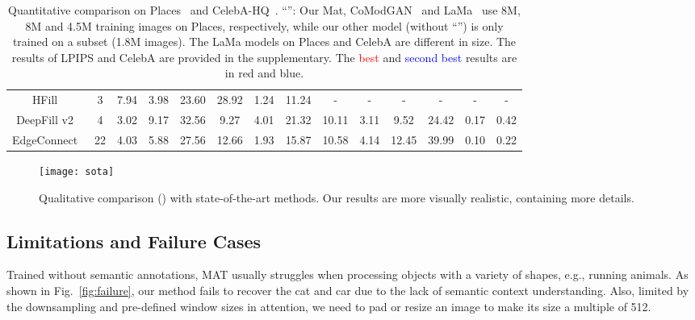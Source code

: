 \documentclass[10pt,twocolumn,letterpaper]{article}
\begin{document}
\begin{table*}[t]
\begin{center}
{\begin{tabular}{c | c | c c c | c c c | c c c | c c c }
					HFill~\cite{yi2020contextual} & 3 & 7.94 & 3.98 & 23.60 & 28.92 & 1.24 & 11.24 & - & - & - & - & - & - \\
					DeepFill v2~\cite{yu2019free} & 4 & 3.02 & 9.17 & 32.56 & 9.27 & 4.01 & 21.32 & 10.11 & 3.11 & 9.52 & 24.42 & 0.17 & 0.42\\
					EdgeConnect~\cite{nazeri2019edgeconnect} & 22 & 4.03 & 5.88 & 27.56 & 12.66 & 1.93 & 15.87 & 10.58 & 4.14 & 12.45 & 39.99 & 0.10 & 0.22 \\
\hline  
				\end{tabular}
			}
		\end{center}
		\vspace{-0.15in}
\caption{Quantitative comparison on Places~\cite{zhou2017places} and CelebA-HQ~\cite{karras2018progressive}. ``'': Our Mat, CoModGAN~\cite{zhao2020large} and LaMa~\cite{suvorov2021resolution} use 8M, 8M and 4.5M training images on Places, respectively, while our other model (without ``'') is only trained on a subset (1.8M images). The LaMa models on Places and CelebA are different in size. The results of LPIPS and  CelebA are provided in the supplementary. The \textcolor{red}{best} and \textcolor{blue}{second best} results are in red and blue.} \label{tab:sota}
	\end{table*}



	\begin{figure*}[t]
		\begin{center}
			\texttt{[image: sota]}
		\end{center}
		\vspace{-0.15in}
		\caption{Qualitative comparison () with state-of-the-art methods. Our results are more visually realistic, containing more details.}
		\label{fig:qualitative}
		\vspace{-0.05in}
	\end{figure*}
	


	\subsection{Limitations and Failure Cases}
	Trained without semantic annotations, MAT usually struggles when processing objects with a variety of shapes, e.g., running animals. As shown in Fig.~\ref{fig:failure}, our method fails to recover the cat and car due to the lack of semantic context understanding. Also, limited by the downsampling and pre-defined window sizes in attention, we need to pad or resize an image to make its size a multiple of 512. 
\end{document}
